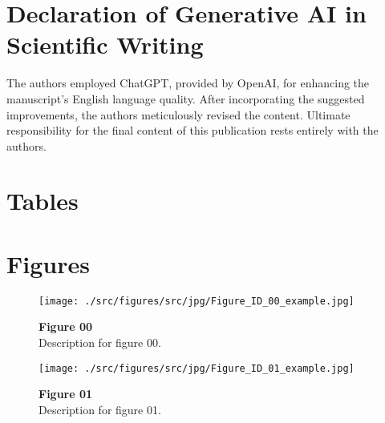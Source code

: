 \documentclass[preprint,review,12pt]{elsarticle}\n
\begin{document}
\section*{Declaration of Generative AI in Scientific Writing}
The authors employed ChatGPT, provided by OpenAI, for enhancing the manuscript's English language quality. After incorporating the suggested improvements, the authors meticulously revised the content. Ultimate responsibility for the final content of this publication rests entirely with the authors.
\label{declaration of generative ai in scientific writing}



\clearpage
\section*{Tables}
\label{tables}

\n

\clearpage
\section*{Figures}
\label{figures}

\begin{figure*}[p]
    \centering
    \texttt{[image: ./src/figures/src/jpg/Figure\_ID\_00\_example.jpg]}
    \caption{
\textbf{
Figure 00
}
\smallskip
\\
Description for figure 00.
}
    \label{fig:00_example}
\end{figure*}

\clearpage
\begin{figure*}[p]
    \centering
    \texttt{[image: ./src/figures/src/jpg/Figure\_ID\_01\_example.jpg]}
    \caption{
\textbf{
Figure 01
}
\smallskip
\\
Description for figure 01.
}
    \label{fig:01_example}
\end{figure*}
\end{document}
